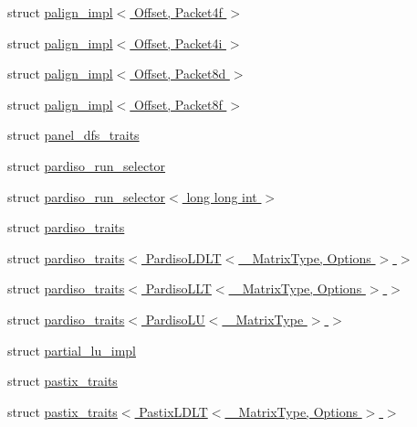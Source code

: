 \begin{DoxyCompactItemize}
\item 
struct \hyperlink{struct_eigen_1_1internal_1_1palign__impl_3_01_offset_00_01_packet4f_01_4}{palign\+\_\+impl$<$ Offset, Packet4f $>$}
\item 
struct \hyperlink{struct_eigen_1_1internal_1_1palign__impl_3_01_offset_00_01_packet4i_01_4}{palign\+\_\+impl$<$ Offset, Packet4i $>$}
\item 
struct \hyperlink{struct_eigen_1_1internal_1_1palign__impl_3_01_offset_00_01_packet8d_01_4}{palign\+\_\+impl$<$ Offset, Packet8d $>$}
\item 
struct \hyperlink{struct_eigen_1_1internal_1_1palign__impl_3_01_offset_00_01_packet8f_01_4}{palign\+\_\+impl$<$ Offset, Packet8f $>$}
\item 
struct \hyperlink{struct_eigen_1_1internal_1_1panel__dfs__traits}{panel\+\_\+dfs\+\_\+traits}
\item 
struct \hyperlink{struct_eigen_1_1internal_1_1pardiso__run__selector}{pardiso\+\_\+run\+\_\+selector}
\item 
struct \hyperlink{struct_eigen_1_1internal_1_1pardiso__run__selector_3_01long_01long_01int_01_4}{pardiso\+\_\+run\+\_\+selector$<$ long long int $>$}
\item 
struct \hyperlink{struct_eigen_1_1internal_1_1pardiso__traits}{pardiso\+\_\+traits}
\item 
struct \hyperlink{struct_eigen_1_1internal_1_1pardiso__traits_3_01_pardiso_l_d_l_t_3_01___matrix_type_00_01_options_01_4_01_4}{pardiso\+\_\+traits$<$ Pardiso\+L\+D\+L\+T$<$ \+\_\+\+Matrix\+Type, Options $>$ $>$}
\item 
struct \hyperlink{struct_eigen_1_1internal_1_1pardiso__traits_3_01_pardiso_l_l_t_3_01___matrix_type_00_01_options_01_4_01_4}{pardiso\+\_\+traits$<$ Pardiso\+L\+L\+T$<$ \+\_\+\+Matrix\+Type, Options $>$ $>$}
\item 
struct \hyperlink{struct_eigen_1_1internal_1_1pardiso__traits_3_01_pardiso_l_u_3_01___matrix_type_01_4_01_4}{pardiso\+\_\+traits$<$ Pardiso\+L\+U$<$ \+\_\+\+Matrix\+Type $>$ $>$}
\item 
struct \hyperlink{struct_eigen_1_1internal_1_1partial__lu__impl}{partial\+\_\+lu\+\_\+impl}
\item 
struct \hyperlink{struct_eigen_1_1internal_1_1pastix__traits}{pastix\+\_\+traits}
\item 
struct \hyperlink{struct_eigen_1_1internal_1_1pastix__traits_3_01_pastix_l_d_l_t_3_01___matrix_type_00_01_options_01_4_01_4}{pastix\+\_\+traits$<$ Pastix\+L\+D\+L\+T$<$ \+\_\+\+Matrix\+Type, Options $>$ $>$}

\end{DoxyCompactItemize}
